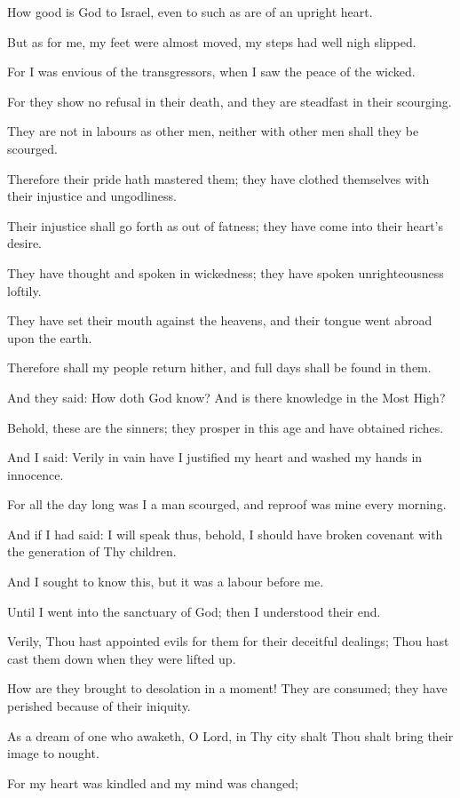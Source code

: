 How good is God to Israel, even to such as are of an upright heart.

But as for me, my feet were almost moved, my steps had well nigh slipped.

For I was envious of the transgressors, when I saw the peace of the wicked.

For they show no refusal in their death, and they are steadfast in their scourging.

They are not in labours as other men, neither with other men shall they be scourged.

Therefore their pride hath mastered them; they have clothed themselves with their injustice and ungodliness.

Their injustice shall go forth as out of fatness; they have come into their heart’s desire.

They have thought and spoken in wickedness; they have spoken unrighteousness loftily.

They have set their mouth against the heavens, and their tongue went abroad upon the earth.

Therefore shall my people return hither, and full days shall be found in them.

And they said: How doth God know? And is there knowledge in the Most High?

Behold, these are the sinners; they prosper in this age and have obtained riches.

And I said: Verily in vain have I justified my heart and washed my hands in innocence.

For all the day long was I a man scourged, and reproof was mine every morning.

And if I had said: I will speak thus, behold, I should have broken covenant with the generation of Thy children.

And I sought to know this, but it was a labour before me.

Until I went into the sanctuary of God; then I understood their end.

Verily, Thou hast appointed evils for them for their deceitful dealings; Thou hast cast them down when they were lifted up.

How are they brought to desolation in a moment! They are consumed; they have perished because of their iniquity.

As a dream of one who awaketh, O Lord, in Thy city shalt Thou shalt bring their image to nought.

For my heart was kindled and my mind was changed;

